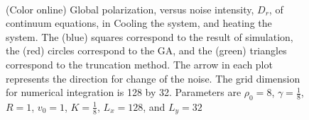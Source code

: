 \documentclass[reprint,floatfix,amsmath,amssymb,aps,pre,showkeys,showpacs,superscriptaddress]{revtex4-1}
\begin{document}
\begin{figure}
	\centering
	\\
	\caption{(Color online) Global polarization, versus noise intensity, $D_r$, of continuum equations, in  Cooling the system, and   heating the system. The (blue) squares correspond to the result of simulation, the (red) circles correspond to the GA, and the (green) triangles correspond to the truncation method. The arrow in each plot represents the direction for change of the noise. The grid dimension for numerical integration is 128 by 32. Parameters are $\rho_0=8$, $\gamma=\tfrac{1}{8}$, $R=1$, $v_0=1$, $K=\tfrac{1}{8}$, $L_x=128$, and $L_y=32$}
	\label{fig:f-alignment}
\end{figure}
\end{document}
